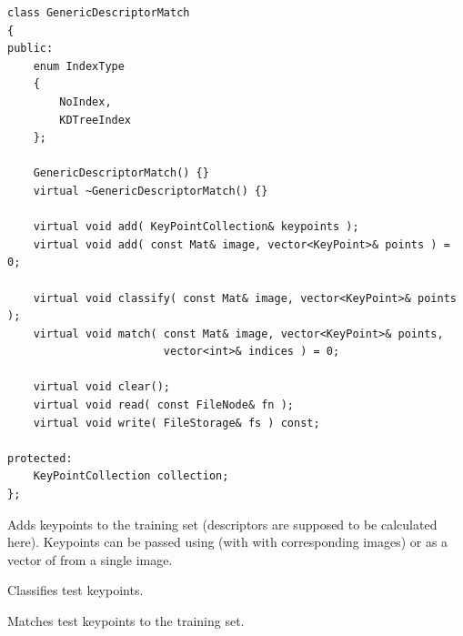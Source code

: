 \begin{lstlisting}
class GenericDescriptorMatch
{
public:
    enum IndexType
    {
        NoIndex,
        KDTreeIndex
    };

    GenericDescriptorMatch() {}
    virtual ~GenericDescriptorMatch() {}

    virtual void add( KeyPointCollection& keypoints );
    virtual void add( const Mat& image, vector<KeyPoint>& points ) = 0;

    virtual void classify( const Mat& image, vector<KeyPoint>& points );
    virtual void match( const Mat& image, vector<KeyPoint>& points,
                        vector<int>& indices ) = 0;
    
    virtual void clear();
    virtual void read( const FileNode& fn );
    virtual void write( FileStorage& fs ) const;
    
protected:
    KeyPointCollection collection;
};

\end{lstlisting}
Adds keypoints to the training set (descriptors are supposed to be calculated here).
Keypoints can be passed using  (with with corresponding images) or as a vector of  from a single image.


\begin{description}
\end{description}



\begin{description}
\end{description}

Classifies test keypoints.


\begin{description}
\end{description}

Matches test keypoints to the training set.

